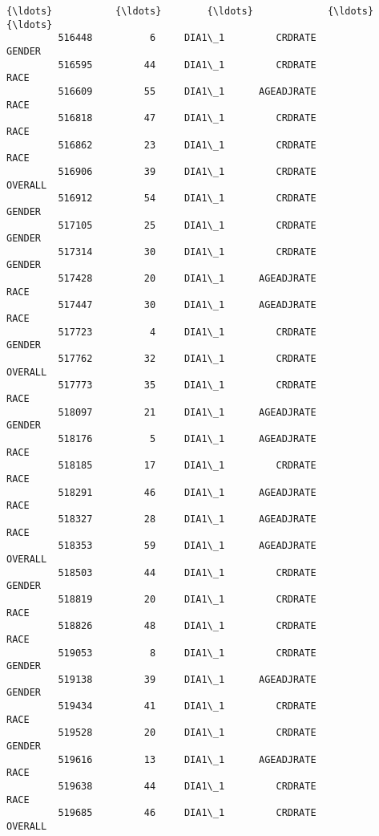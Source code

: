 \documentclass[11pt]{article}
\begin{document}
\begin{Verbatim}[commandchars=\\\{\}]
         {\ldots}           {\ldots}        {\ldots}             {\ldots}                        {\ldots}   
         516448          6     DIA1\_1         CRDRATE                     GENDER   
         516595         44     DIA1\_1         CRDRATE                       RACE   
         516609         55     DIA1\_1      AGEADJRATE                       RACE   
         516818         47     DIA1\_1         CRDRATE                       RACE   
         516862         23     DIA1\_1         CRDRATE                       RACE   
         516906         39     DIA1\_1         CRDRATE                    OVERALL   
         516912         54     DIA1\_1         CRDRATE                     GENDER   
         517105         25     DIA1\_1         CRDRATE                     GENDER   
         517314         30     DIA1\_1         CRDRATE                     GENDER   
         517428         20     DIA1\_1      AGEADJRATE                       RACE   
         517447         30     DIA1\_1      AGEADJRATE                       RACE   
         517723          4     DIA1\_1         CRDRATE                     GENDER   
         517762         32     DIA1\_1         CRDRATE                    OVERALL   
         517773         35     DIA1\_1         CRDRATE                       RACE   
         518097         21     DIA1\_1      AGEADJRATE                     GENDER   
         518176          5     DIA1\_1      AGEADJRATE                       RACE   
         518185         17     DIA1\_1         CRDRATE                       RACE   
         518291         46     DIA1\_1      AGEADJRATE                       RACE   
         518327         28     DIA1\_1      AGEADJRATE                       RACE   
         518353         59     DIA1\_1      AGEADJRATE                    OVERALL   
         518503         44     DIA1\_1         CRDRATE                     GENDER   
         518819         20     DIA1\_1         CRDRATE                       RACE   
         518826         48     DIA1\_1         CRDRATE                       RACE   
         519053          8     DIA1\_1         CRDRATE                     GENDER   
         519138         39     DIA1\_1      AGEADJRATE                     GENDER   
         519434         41     DIA1\_1         CRDRATE                       RACE   
         519528         20     DIA1\_1         CRDRATE                     GENDER   
         519616         13     DIA1\_1      AGEADJRATE                       RACE   
         519638         44     DIA1\_1         CRDRATE                       RACE   
         519685         46     DIA1\_1         CRDRATE                    OVERALL   
         

\end{Verbatim}
\end{document}
